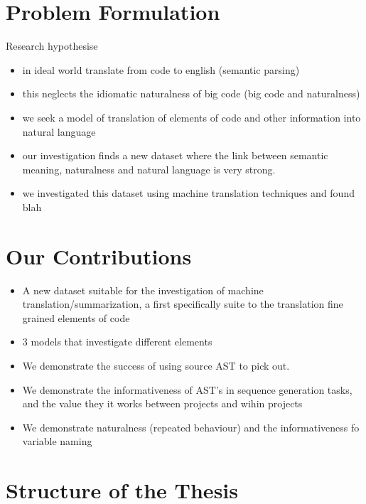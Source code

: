 

\section{Problem Formulation} %
\label{sec:problem_formulation}

Research hypothesise

\begin{itemize}
    \item in ideal world translate from code to english (semantic parsing)
    \item this neglects the idiomatic naturalness of big code (big code and naturalness)
    \item we seek a model of translation of elements of code and other information into natural language
    \item our investigation finds a new dataset where the link between semantic meaning, naturalness and natural language is very strong. 
    \item we investigated this dataset using machine translation techniques and found blah
\end{itemize}
 
\section{Our Contributions}
\begin{itemize}
    \item A new dataset suitable for the investigation of machine translation/summarization, a first specifically suite to the translation fine grained elements of code
    \item 3 models that investigate different elements
    \item We demonstrate the success of using source AST to pick out. 
    \item We demonstrate the informativeness of AST's in sequence generation tasks, and the value they it works between projects and wihin projects
    \item We demonstrate naturalness (repeated behaviour) and the informativeness fo variable naming
\end{itemize}


\section{Structure of the Thesis} %
\label{sec:structure_of_the_thesis}

